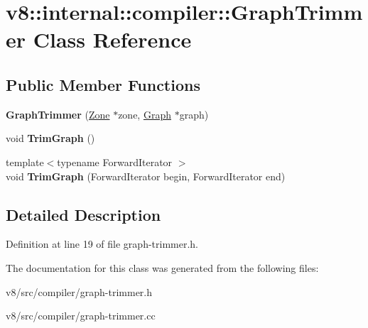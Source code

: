 \hypertarget{classv8_1_1internal_1_1compiler_1_1GraphTrimmer}{}\section{v8\+:\+:internal\+:\+:compiler\+:\+:Graph\+Trimmer Class Reference}
\label{classv8_1_1internal_1_1compiler_1_1GraphTrimmer}
\subsection*{Public Member Functions}
\begin{DoxyCompactItemize}
\item 
\mbox{\label{classv8_1_1internal_1_1compiler_1_1GraphTrimmer_a4fc6717624c150af0b0977774c6e20a9}} 
{\bfseries Graph\+Trimmer} (\mbox{\hyperlink{classv8_1_1internal_1_1Zone}{Zone}} $\ast$zone, \mbox{\hyperlink{classv8_1_1internal_1_1compiler_1_1Graph}{Graph}} $\ast$graph)
\item 
\mbox{\label{classv8_1_1internal_1_1compiler_1_1GraphTrimmer_afdbaeba88b2dbf5a1dfdef3e70226a18}} 
void {\bfseries Trim\+Graph} ()
\item 
\mbox{\label{classv8_1_1internal_1_1compiler_1_1GraphTrimmer_ab9e55dcb8d7e33ff7d9d5b3019165dc3}} 
{\footnotesize template$<$typename Forward\+Iterator $>$ }\\void {\bfseries Trim\+Graph} (Forward\+Iterator begin, Forward\+Iterator end)
\end{DoxyCompactItemize}


\subsection{Detailed Description}


Definition at line 19 of file graph-\/trimmer.\+h.



The documentation for this class was generated from the following files\+:\begin{DoxyCompactItemize}
\item 
v8/src/compiler/graph-\/trimmer.\+h\item 
v8/src/compiler/graph-\/trimmer.\+cc\end{DoxyCompactItemize}
